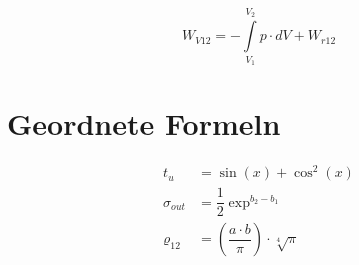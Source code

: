         \begin{equation}
            W_{V12} = - \int\limits_{V_1}^{V_2} p \cdot dV + W_{r12}
        \end{equation}

    \section{Geordnete Formeln}

        \begin{align}
            t_u &= \sin(x) + \cos^2(x)\\
            \sigma_{out} &= \dfrac{1}{2} \exp^{b_2 - b_1}\nonumber\\
            \varrho_{12} &= \left(\dfrac{a \cdot b}{\pi}\right) \cdot \sqrt[4]{\pi}
        \end{align}